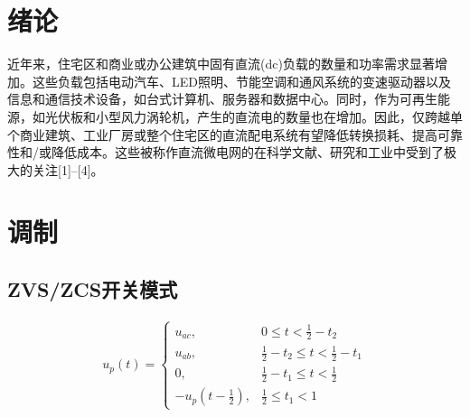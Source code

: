 \documentclass[journal]{IEEEtran}
\begin{document}
%
\IEEEpeerreviewmaketitle



\section{绪论}
% 
% 
% 
% 
近年来，住宅区和商业或办公建筑中固有直流(dc)负载的数量和功率需求显著增加。这些负载包括电动汽车、LED照明、节能空调和通风系统的变速驱动器以及信息和通信技术设备，如台式计算机、服务器和数据中心。同时，作为可再生能源，如光伏板和小型风力涡轮机，产生的直流电的数量也在增加。因此，仅跨越单个商业建筑、工业厂房或整个住宅区的直流配电系统有望降低转换损耗、提高可靠性和/或降低成本。这些被称作直流微电网的在科学文献、研究和工业中受到了极大的关注[1]–[4]。


\section{调制}

\subsection{ZVS/ZCS开关模式}

\vspace*{-1em} %
\begin{gather} %
u_p(t)=
\begin{cases}
	u_{ac},& {0\leq t < \frac{1}{2} -t_2}\\
	u_{ab},& {\frac{1}{2} -t_2 \leq t < \frac{1}{2} -t_1 }\\
	0,& {\frac{1}{2} -t_1 \leq t < \frac{1}{2}}\\
	-u_p(t-\frac{1}{2}),& {\frac{1}{2} \leq t_1 < 1}
	\end{cases}
\end{gather}
\end{document}
